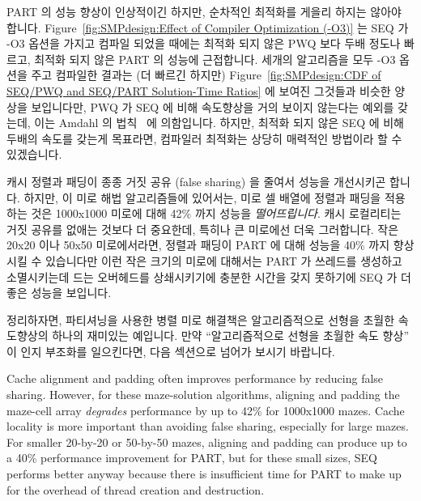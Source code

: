 PART 의 성능 향상이 인상적이긴 하지만, 순차적인 최적화를 게을리 하지는 않아야
합니다.
Figure~\ref{fig:SMPdesign:Effect of Compiler Optimization (-O3)} 는 SEQ 가 -O3
옵션을 가지고 컴파일 되었을 때에는 최적화 되지 않은 PWQ 보다 두배 정도나
빠르고, 최적화 되지 않은 PART 의 성능에 근접합니다.
세개의 알고리즘을 모두 -O3 옵션을 주고 컴파일한 결과는 (더 빠르긴 하지만)
Figure~\ref{fig:SMPdesign:CDF of SEQ/PWQ and SEQ/PART Solution-Time Ratios} 에
보여진 그것들과 비슷한 양상을 보입니다만, PWQ 가 SEQ 에 비해 속도향상을 거의
보이지 않는다는 예외를 갖는데, 이는
Amdahl 의 법칙~\cite{GeneAmdahl1967AmdahlsLaw} 에 의함입니다.
하지만, 최적화 되지 않은 SEQ 에 비해 두배의 속도를 갖는게 목표라면, 컴파일러
최적화는 상당히 매력적인 방법이라 할 수 있겠습니다.

캐시 정렬과 패딩이 종종 거짓 공유 (false sharing) 을 줄여서 성능을 개선시키곤
합니다.
하지만, 이 미로 해법 알고리즘들에 있어서는, 미로 셀 배열에 정렬과 패딩을
적용하는 것은 1000x1000 미로에 대해 42\% 까지 성능을 \emph{떨어뜨립니다}.
캐시 로컬리티는 거짓 공유를 없애는 것보다 더 중요한데, 특히나 큰 미로에선 더욱
그러합니다.
작은 20x20 이나 50x50 미로에서라면, 정렬과 패딩이 PART 에 대해 성능을 40\% 까지
향상시킬 수 있습니다만 이런 작은 크기의 미로에 대해서는 PART 가 쓰레드를
생성하고 소멸시키는데 드는 오버헤드를 상쇄시키기에 충분한 시간을 갖지 못하기에
SEQ 가 더 좋은 성능을 보입니다.

정리하자면, 파티셔닝을 사용한 병렬 미로 해결책은 알고리즘적으로 선형을 초월한
속도향상의 하나의 재미있는 예입니다.
만약 ``알고리즘적으로 선형을 초월한 속도 향상'' 이 인지 부조화를 일으킨다면,
다음 섹션으로 넘어가 보시기 바랍니다.
\iffalse

Cache alignment and padding often improves performance by reducing
false sharing.
However, for these maze-solution algorithms, aligning and padding the
maze-cell array \emph{degrades} performance by up to 42\% for 1000x1000 mazes.
Cache locality is more important than avoiding
false sharing, especially for large mazes.
For smaller 20-by-20 or 50-by-50 mazes, aligning and padding can produce
up to a 40\% performance improvement for PART,
but for these small sizes, SEQ performs better anyway because there
is insufficient time for PART to make up for the overhead of
thread creation and destruction.


